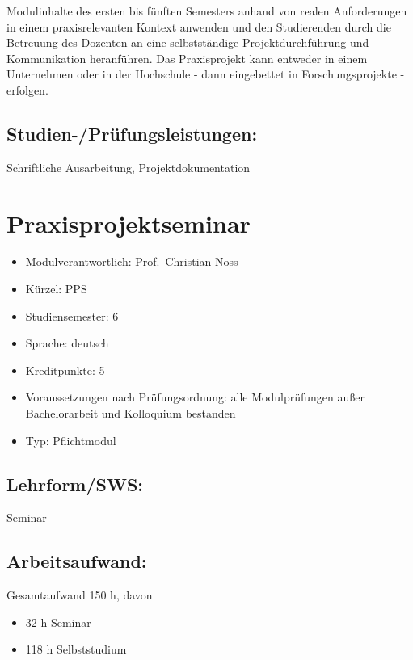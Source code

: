 Modulinhalte des ersten bis fünften Semesters anhand von realen
Anforderungen in einem praxisrelevanten Kontext anwenden und den
Studierenden durch die Betreuung des Dozenten an eine selbstständige
Projektdurchführung und Kommunikation heranführen. Das Praxisprojekt
kann entweder in einem Unternehmen oder in der Hochschule - dann
eingebettet in Forschungsprojekte - erfolgen.

\section*{Studien-/Prüfungsleistungen:}\label{studien-pruxfcfungsleistungen-16}

Schriftliche Ausarbeitung, Projektdokumentation

\chapter{Praxisprojektseminar}\label{praxisprojektseminar}

\begin{itemize}
\tightlist
\item
  Modulverantwortlich: Prof.~Christian Noss
\item
  Kürzel: PPS
\item
  Studiensemester: 6
\item
  Sprache: deutsch
\item
  Kreditpunkte: 5
\item
  Voraussetzungen nach Prüfungsordnung: alle Modulprüfungen außer
  Bachelorarbeit und Kolloquium bestanden
\item
  Typ: Pflichtmodul
\end{itemize}

\section*{Lehrform/SWS:}\label{lehrformsws-19}

Seminar

\section*{Arbeitsaufwand:}\label{arbeitsaufwand-18}

Gesamtaufwand 150 h, davon

\begin{itemize}
\tightlist
\item
  32 h Seminar
\item
  118 h Selbststudium
\end{itemize}

